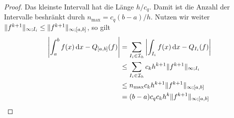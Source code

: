 \begin{proof}
  Das kleinste Intervall hat die Länge $h/c_q$. Damit ist die Anzahl
  der Intervalle beshränkt durch $n_{\max}=c_q (b-a)/h$. Nutzen wir weiter
  $\lVert f^{k+1}\rVert_{\infty;I_i} \le \lVert f^{k+1}\rVert_{\infty;[a,b]}$, so gilt
  \begin{align}
    \left|\int_a^b f(x)\,\mathrm{d} x - Q_{[a,b]}(f)\right|
    &= \sum_{I_i\in\mathcal I_h}  \left|\int_{I_i} f(x)\,\mathrm{d} x - Q_{I_i}(f)\right|\\
    &\le \sum_{I_i\in\mathcal I_h} c_k h^{k+1} \lVert f^{k+1}\rVert_{\infty;I_i}\\
    & \le n_{\max} c_k h^{k+1} \lVert f^{k+1}\rVert_{\infty;[a,b]}\\
    & = (b-a) c_q c_k h^{k} \lVert f^{k+1}\rVert_{\infty;[a,b]}
  \end{align}
\end{proof}




